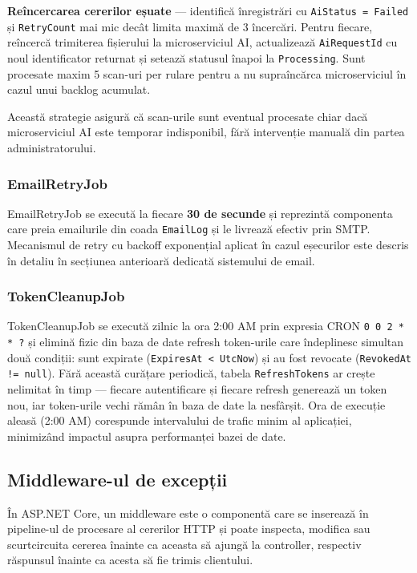 \documentclass[12pt, a4paper]{report}
\begin{document}
\textbf{Reîncercarea cererilor eșuate} --- identifică înregistrări cu
\texttt{AiStatus = Failed} și \texttt{RetryCount} mai mic decât limita maximă
de 3 încercări. Pentru fiecare, reîncercă trimiterea fișierului la microserviciul
AI, actualizează \texttt{AiRequestId} cu noul identificator returnat și setează
statusul înapoi la \texttt{Processing}. Sunt procesate maxim 5 scan-uri per
rulare pentru a nu supraîncărca microserviciul în cazul unui backlog acumulat.

Această strategie asigură că scan-urile sunt eventual procesate chiar dacă
microserviciul AI este temporar indisponibil, fără intervenție manuală din
partea administratorului.

\subsubsection{EmailRetryJob}

EmailRetryJob se execută la fiecare \textbf{30 de secunde} și
reprezintă componenta care preia emailurile din coada \texttt{EmailLog} și
le livrează efectiv prin SMTP. Mecanismul de retry cu backoff exponențial
aplicat în cazul eșecurilor este descris în detaliu în secțiunea anterioară
dedicată sistemului de email.

\subsubsection{TokenCleanupJob}

TokenCleanupJob se execută zilnic la ora 2:00 AM prin
expresia CRON \texttt{0 0 2 * * ?} și elimină fizic din baza de date refresh
token-urile care îndeplinesc simultan două condiții: sunt expirate
(\texttt{ExpiresAt < UtcNow}) și au fost revocate (\texttt{RevokedAt != null}).
Fără această curățare periodică, tabela \texttt{RefreshTokens} ar crește
nelimitat în timp --- fiecare autentificare și fiecare refresh generează un
token nou, iar token-urile vechi rămân în baza de date la nesfârșit. Ora de
execuție aleasă (2:00 AM) corespunde intervalului de trafic minim al aplicației,
minimizând impactul asupra performanței bazei de date.


\subsection{Middleware-ul de excepții}

În ASP.NET Core, un middleware este o componentă care se inserează în pipeline-ul
de procesare al cererilor HTTP și poate inspecta, modifica sau scurtcircuita
cererea înainte ca aceasta să ajungă la controller, respectiv răspunsul înainte
ca acesta să fie trimis clientului.
\end{document}
